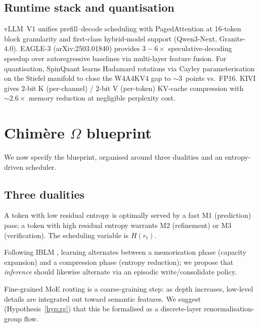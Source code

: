\documentclass[10pt,a4paper]{article}
\theoremstyle{remark}
\begin{document}
\subsection{Runtime stack and quantisation}
\label{sec:runtime}

vLLM~V1 unifies prefill--decode scheduling with PagedAttention at
16-token block granularity and first-class hybrid-model support
(Qwen3-Next, Granite-4.0). EAGLE-3 (arXiv:2503.01840)
\cite{EAGLE3} provides $3\!-\!6\!\times$ speculative-decoding
speedup over autoregressive baselines via multi-layer feature
fusion. For quantisation, SpinQuant \cite{SpinQuant2024} learns
Hadamard rotations via Cayley parameterisation on the Stiefel
manifold to close the W4A4KV4 gap to $\sim 3$~points vs.\ FP16.
KIVI \cite{KIVI2024} gives $2$-bit K (per-channel) / $2$-bit V
(per-token) KV-cache compression with $\sim 2.6\times$ memory
reduction at negligible perplexity cost.

\section{Chim\`ere $\Omega$ blueprint}
\label{sec:blueprint}

We now specify the blueprint, organised around three dualities and
an entropy-driven scheduler.

\subsection{Three dualities}
\label{sec:dualities}

\begin{description}[leftmargin=*,itemsep=3pt]
 \item[D1. Predict vs.\ compute.] A token with low residual entropy
   is optimally served by a fast M1 (prediction) pass; a token with
   high residual entropy warrants M2 (refinement) or M3
   (verification). The scheduling variable is $H(r_t)$.
 \item[D2. Memorise vs.\ compress.] Following IBLM \cite{IBLM2025},
   learning alternates between a memorisation phase (capacity
   expansion) and a compression phase (entropy reduction); we
   propose that \emph{inference} should likewise alternate via an
   episodic write/consolidate policy.
 \item[D3. Local vs.\ global.] Fine-grained MoE routing is a
   coarse-graining step: as depth increases, low-level details are
   integrated out toward semantic features. We suggest
   (Hypothesis~\ref{hyp:rg}) that this be formalised as a
   discrete-layer renormalisation-group flow.
\end{description}
\end{document}
